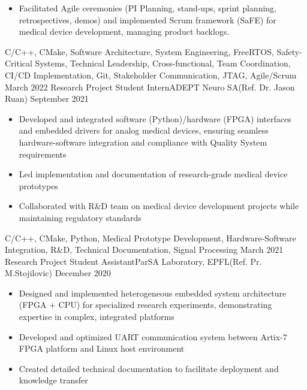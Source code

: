 \begin{experiences}
{\begin{itemize}
                        \item Facilitated Agile ceremonies (PI Planning, stand-ups, sprint planning, retrospectives, demos) and implemented Scrum framework (SaFE) for medical device development, managing product backlogs. 
                      \end{itemize}
                    }
                {C/C++, CMake, Software Architecture, System Engineering, FreeRTOS, Safety-Critical Systems, Technical Leadership, Cross-functional, Team Coordination, CI/CD Implementation, Git, Stakeholder Communication, JTAG, Agile/Scrum}
  \emptySeparator
  \experience
    {March 2022}   {Research Project Student Intern}{ADEPT Neuro SA}{(Ref. Dr. Jason Ruan)}
    {September 2021} {
                      \begin{itemize}
                        \item Developed and integrated software (Python)/hardware (FPGA) interfaces and embedded drivers for analog medical devices, ensuring seamless hardware-software integration and compliance with Quality System requirements
                        \item Led implementation and documentation of research-grade medical device prototypes
                        \item Collaborated with R\&D team on medical device development projects while maintaining regulatory standards
                      \end{itemize}
                    }
                    {C/C++, CMake, Python, Medical Prototype Development, Hardware-Software Integration, R\&D, Technical Documentation, Signal Processing}
  \emptySeparator
  \experience
    {March 2021}   {Research Project Student Assistant}{ParSA Laboratory, EPFL}{(Ref. Pr. M.Stojilovic)}
    {December 2020} {
                      \begin{itemize}
                        \item Designed and implemented heterogeneous embedded system architecture (FPGA + CPU) for specialized research experiments, demonstrating expertise in complex, integrated platforms
                        \item Developed and optimized UART communication system between Artix-7 FPGA platform and Linux host environment
                        \item Created detailed technical documentation to facilitate deployment and knowledge transfer
                      \end{itemize}
                    }

\end{experiences}
